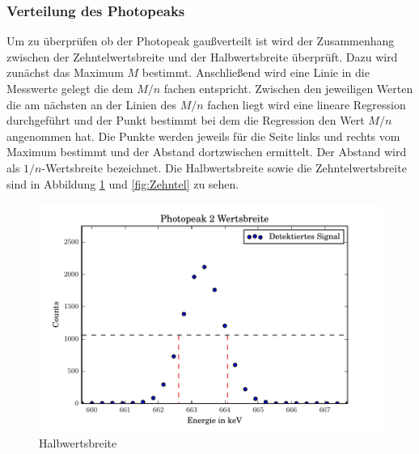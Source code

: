 \subsubsection{Verteilung des Photopeaks}
Um zu überprüfen ob der Photopeak gaußverteilt ist wird der Zusammenhang zwischen der Zehntelwertsbreite und der Halbwertsbreite überprüft. Dazu wird zunächst das Maximum $M$ bestimmt. Anschließend wird eine Linie in die Messwerte gelegt die dem $M/n$ fachen entspricht. Zwischen den jeweiligen Werten die am nächsten an der Linien des $M/n$ fachen liegt wird eine lineare Regression durchgeführt und der Punkt bestimmt bei dem die Regression den Wert $M/n$ angenommen hat. Die Punkte werden jeweils für die Seite links und rechts vom Maximum bestimmt und der Abstand dortzwischen ermittelt. Der Abstand wird als $1/n$-Wertsbreite bezeichnet.
Die Halbwertsbreite sowie die Zehntelwertsbreite sind in Abbildung \ref{fig:Halb} und \ref{fig:Zehntel} zu sehen.

\begin{figure}[h]
  \centering
  \includegraphics[width=\textwidth]{./build/2Wertsbreite.pdf}
  \caption{Halbwertsbreite}
  \label{fig:Halb}
\end{figure}

